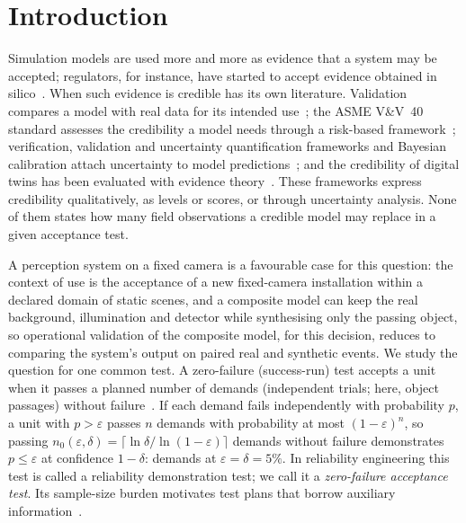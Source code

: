 \section{Introduction}\label{sec:intro}

Simulation models are used more and more as evidence that a system may be accepted; regulators, for instance, have
started to accept evidence obtained in silico~\cite{viceconti2021insilico}. When such evidence is credible has its own
literature. Validation compares a model with real data for its intended use~\cite{sargent2013vv,oberkampf2010vv,oberkampf2004vvcomp};
the ASME V\&V~40 standard assesses the credibility a model needs through a risk-based framework~\cite{asme2018vv40,aldieri2023vv40};
verification, validation and uncertainty quantification frameworks and Bayesian calibration attach uncertainty to model
predictions~\cite{roy2011vvuq,kennedy2001calibration}; and the credibility of digital twins has been evaluated with
evidence theory~\cite{shi2025dtcredibility}. These frameworks express credibility qualitatively, as levels or scores,
or through uncertainty analysis. None of them states how many field observations a credible model may replace in a
given acceptance test.

A perception system on a fixed camera is a favourable case for this question: the context of use is the acceptance of a new
fixed-camera installation within a declared domain of static scenes, and a composite model can keep the real background, illumination and detector while synthesising only
the passing object, so operational validation of the composite model, for this decision, reduces to comparing the system's output on
paired real and synthetic events. We
study the question for one common test. A zero-failure (success-run) test accepts a unit when it passes a planned
number of demands (independent trials; here, object passages) without failure~\cite{hanley1983,meeker2017}. If each demand fails independently with probability $p$,
a unit with $p>\varepsilon$ passes $n$ demands with probability at most $(1-\varepsilon)^n$, so passing
$n_0(\varepsilon,\delta)=\lceil\ln\delta/\ln(1-\varepsilon)\rceil$ demands without failure demonstrates $p\le\varepsilon$
at confidence $1-\delta$: \nNzero{} demands at $\varepsilon=\delta=5\%$. In reliability engineering this test is called
a reliability demonstration test; we call it a \emph{zero-failure acceptance test}. Its sample-size burden motivates
test plans that borrow auxiliary information~\cite{ding2024truncated,wang2024monoprop}.

